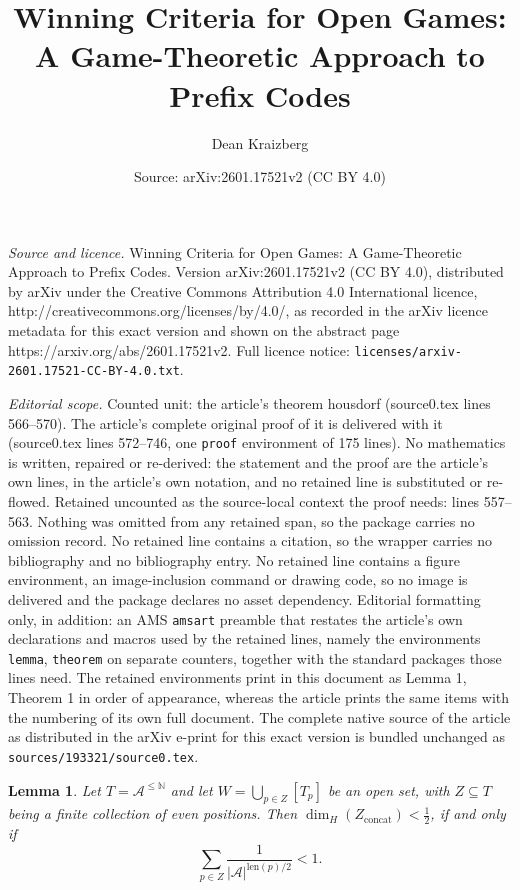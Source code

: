 \documentclass[10pt,a4paper]{amsart}
\title{Winning Criteria for Open Games: A Game-Theoretic Approach to Prefix Codes}
\author{Dean Kraizberg}
\date{Source: arXiv:2601.17521v2 (CC BY 4.0)}
\newtheorem{lemma}{Lemma}
\begin{document}
\maketitle

\noindent\emph{Source and licence.} Winning Criteria for Open Games: A Game-Theoretic Approach to Prefix Codes. Version arXiv:2601.17521v2 (CC BY 4.0), distributed by arXiv under the Creative Commons Attribution 4.0 International licence, http://creativecommons.org/licenses/by/4.0/, as recorded in the arXiv licence metadata for this exact version and shown on the abstract page https://arxiv.org/abs/2601.17521v2. Full licence notice: \texttt{licenses/arxiv-2601.17521-CC-BY-4.0.txt}.\par\smallskip

\noindent\textit{Editorial scope.} Counted unit: the article's theorem housdorf (source0.tex lines 566--570). The article's complete original proof of it is delivered with it (source0.tex lines 572--746, one \texttt{proof} environment of 175 lines). No mathematics is written, repaired or re-derived: the statement and the proof are the article's own lines, in the article's own notation, and no retained line is substituted or re-flowed.  Retained uncounted as the source-local context the proof needs: lines 557--563.  Nothing was omitted from any retained span, so the package carries no omission record.  No retained line contains a citation, so the wrapper carries no bibliography and no bibliography entry.  No retained line contains a figure environment, an image-inclusion command or drawing code, so no image is delivered and the package declares no asset dependency.  Editorial formatting only, in addition: an AMS \texttt{amsart} preamble that restates the article's own declarations and macros used by the retained lines, namely the environments \texttt{lemma}, \texttt{theorem} on separate counters, together with the standard packages those lines need.  The retained environments print in this document as Lemma 1, Theorem 1 in order of appearance, whereas the article prints the same items with the numbering of its own full document.  The complete native source of the article as distributed in the arXiv e-print for this exact version is bundled unchanged as \texttt{sources/193321/source0.tex}.
\begin{lemma} \label{lemma: Housdorf and sum 1/2}
Let $T=\mathcal A^{\leq \mathbb N}$ and let $W=\bigcup_{p\in Z}[T_p]$ be an open set, with $Z \subseteq T$ being a finite collection of even positions.  
Then $\dim_H(Z_{\mathrm{concat}})<\tfrac12$, if and only if
\[
\sum_{p\in Z} \frac{1}{|\mathcal A|^{ \mathrm{len}(p)/2 }} < 1.
\]
\end{lemma}
\end{document}
